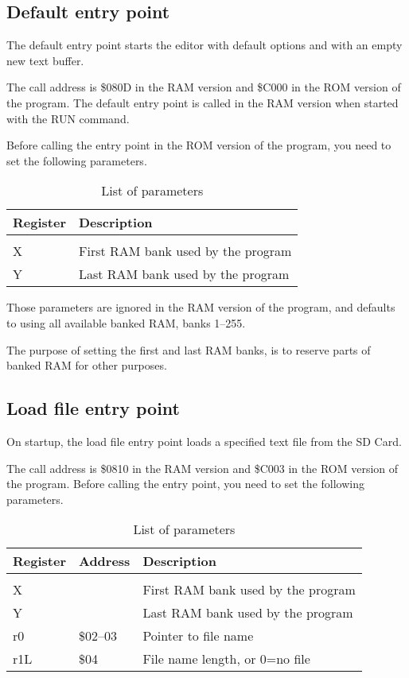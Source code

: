 \documentclass{article}
\begin{document}
    \subsection{Default entry point}

        The default entry point starts the editor with default options and with an
        empty new text buffer.

        The call address is \$080D in the RAM version and \$C000
        in the ROM version of the program. The default entry point is called in
        the RAM version when started with the RUN command.

        Before calling the entry point in the ROM version of the program, you need to set the following
        parameters.

        \begin{longtable}{l l}
            \caption{List of parameters} \\
	        \textbf{Register} & \textbf{Description} \\
	        \hline \\
            X  & First RAM bank used by the program \\
            Y  & Last RAM bank used by the program \\
        \end{longtable}

        \noindent Those parameters are ignored in the RAM version of the program, and
        defaults to using all available banked RAM, banks 1--255.

        The purpose of setting the first and last RAM banks, is to reserve parts of banked RAM
        for other purposes.

    \subsection{Load file entry point}

        On startup, the load file entry point loads a specified text file from the SD Card.

        The call address is \$0810 in the RAM version and \$C003 in the ROM version of the program.
        Before calling the entry point, you need to set the following parameters.

        \begin{longtable}{l l l}
            \caption{List of parameters} \\
	        \textbf{Register} & \textbf{Address} & \textbf{Description} \\
	        \hline \\
            X   &          & First RAM bank used by the program \\
            Y   &          & Last RAM bank used by the program \\
            r0  & \$02--03 & Pointer to file name \\
            r1L & \$04     & File name length, or 0=no file \\
        \end{longtable}
\end{document}

